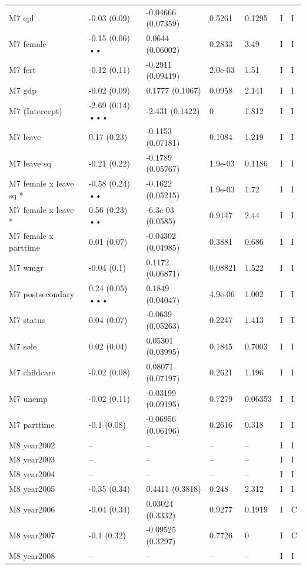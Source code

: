 {\begin{longtable}{@{}p{.245\linewidth}p{.17\linewidth}p{.17\linewidth}p{.085\linewidth}p{.060\linewidth}p{.08\linewidth}p{.07\linewidth}@{}}
M7 epl & -0.03 (0.09) & -0.04666 (0.07359) & 0.5261 & 0.1295 & I & I\\
M7 female & -0.15 (0.06) •• & 0.0644 (0.06002) & 0.2833 & 3.49 & I & I\\
M7 fert & -0.12 (0.11) & -0.2911 (0.09419) & 2.0e-03 & 1.51 & I & I\\
M7 gdp & -0.02 (0.09) & 0.1777 (0.1067) & 0.0958 & 2.141 & I & I\\
M7 (Intercept) & -2.69 (0.14) ••• & -2.431 (0.1422) & 0 & 1.812 & I & I\\
M7 leave & 0.17 (0.23) & -0.1153 (0.07181) & 0.1084 & 1.219 & I & I\\
M7 leave sq & -0.21 (0.22) & -0.1789 (0.05767) & 1.9e-03 & 0.1186 & I & I\\
M7 female x leave sq * & -0.58 (0.24) •• & -0.1622 (0.05215) & 1.9e-03 & 1.72 & I & I\\
M7 female x leave * & 0.56 (0.23) •• & -6.3e-03 (0.0585) & 0.9147 & 2.44 & I & I\\
M7 female x parttime & 0.01 (0.07) & -0.04302 (0.04985) & 0.3881 & 0.686 & I & I\\
M7 wmgr & -0.04 (0.1) & 0.1172 (0.06871) & 0.08821 & 1.522 & I & I\\
M7 postsecondary & 0.24 (0.05) ••• & 0.1849 (0.04047) & 4.9e-06 & 1.002 & I & I\\
M7 status & 0.04 (0.07) & -0.0639 (0.05263) & 0.2247 & 1.413 & I & I\\
M7 sole & 0.02 (0.04) & 0.05301 (0.03995) & 0.1845 & 0.7003 & I & I\\
M7 childcare & -0.02 (0.08) & 0.08071 (0.07197) & 0.2621 & 1.196 & I & I\\
M7 unemp & -0.02 (0.11) & -0.03199 (0.09195) & 0.7279 & 0.06353 & I & I\\
M7 parttime & -0.1 (0.08) & -0.06956 (0.06196) & 0.2616 & 0.318 & I & I\\
M8 year2002 & -- & -- & -- & -- & I & I\\
M8 year2003 & -- & -- & -- & -- & I & I\\
M8 year2004 & -- & -- & -- & -- & I & I\\
M8 year2005 & -0.35 (0.34) & 0.4411 (0.3818) & 0.248 & 2.312 & I & I\\
M8 year2006 & -0.04 (0.34) & 0.03024 (0.3332) & 0.9277 & 0.1919 & I & C\\
M8 year2007 & -0.1 (0.32) & -0.09525 (0.3297) & 0.7726 & 0 & I & C\\
M8 year2008 & -- & -- & -- & -- & I & I\\

\end{longtable}}
